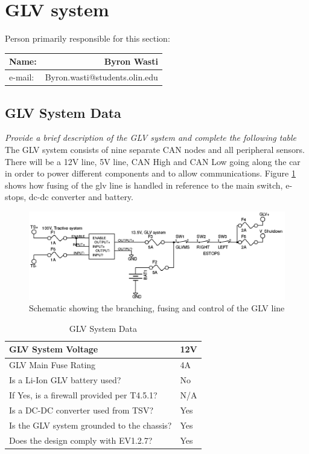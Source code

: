 \documentclass{article}
\begin{document}
\section{GLV system}
Person primarily responsible for this section:

    \begin{table}[H]
        \centering
        \label{responsible7}
        \begin{tabular}{lr}
        Name: & Byron Wasti \\ \hline
        e-mail: & Byron.wasti@students.olin.edu \\ \hline
        \end{tabular}
    \end{table}

\subsection{GLV System Data}

\textit{Provide a brief description of the GLV system and complete the following table}\\

\textnormal{The GLV system consists of nine separate CAN nodes and all peripheral sensors. There will be a 12V line, 5V line, CAN High and CAN Low going along the car in order to power different components and to allow communications. Figure \ref{glvfusing} shows how fusing of the glv line is handled in reference to the main switch, e-stops, dc-dc converter and battery.}

\begin{figure}[H]
    \centering
    \includegraphics[width = 0.7 \textwidth]{glvfusing}
    \caption{Schematic showing the branching, fusing and control of the GLV line}
    \label{glvfusing}
\end{figure}

\begin{table}[H]
\centering
\begin{tabular}{|l|l|}
\hline
GLV System Voltage & 12V \\ \hline
GLV Main Fuse Rating & 4A \\ \hline
Is a Li-Ion GLV battery used? & No \\ \hline
If Yes, is a firewall provided per T4.5.1? & N/A \\ \hline
Is a DC-DC converter used from TSV? & Yes \\ \hline
Is the GLV system grounded to the chassis? & Yes \\ \hline
Does the design comply with EV1.2.7? & Yes \\ \hline
\end{tabular}
\caption{GLV System Data}
\label{glvtable}
\end{table}
\end{document}
